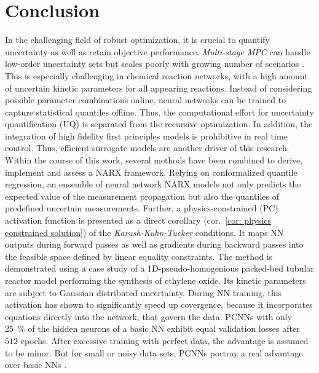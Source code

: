 \chapter{Conclusion}

In the challenging field of robust optimization, it is crucial
to quantify uncertainty as well as retain objective performance.
\emph{Multi-stage MPC} can handle low-order uncertainty sets but scales
poorly with growing number of scenarios \cite{lucia2015}. This is especially challenging in 
chemical reaction networks, with a high amount of uncertain kinetic parameters
for all appearing reactions. Instead of considering possible parameter combinations online,
neural networks can be trained to capture statistical quantiles offline.
Thus, the computational effort for uncertainty quantification (UQ) is separated from the recursive
optimization. In addition, the integration of high fidelity first principles models is prohibitive in real time control.
Thus, efficient surrogate models are another driver of this research.
\newline
\newline
\noindent
Within the course of this work, several methods have been combined
to derive, implement and assess a NARX framework.
Relying on conformalized quantile regression, an ensemble of neural network NARX
models not only predicts the expected value of the measurement propagation but also
the quantiles of predefined uncertain measurements. Further, a physics-constrained (PC)
activation function is presented as a direct corollary (cor.~\ref{cor: physics constrained solution})
of the \emph{Karush-Kuhn-Tucker} conditions. It maps NN outputs during forward passes as well as gradients 
during backward passes into the feasible space defined by linear equality constraints.
The method is demonstrated using a case study
of a 1D-pseudo-homogenious packed-bed tubular reactor model performing the synthesis of ethylene oxide.
Its kinetic parameters are subject to Gaussian distributed uncertainty.
\newline
\newline
\noindent
During NN training, this activation has shown
to significantly speed up covergence, because it incorporates 
equations directly into the network, that govern the data.
PCNNs with only \SI{25}{\%} of the hidden neurons
of a basic NN exhibit equal validation losses after $512$ epochs.
After excessive training with perfect data, the advantage is assumed to be minor.  
But for small or noisy data sets, PCNNs portray a real advantage over
basic NNs \cite{chen2024}.
